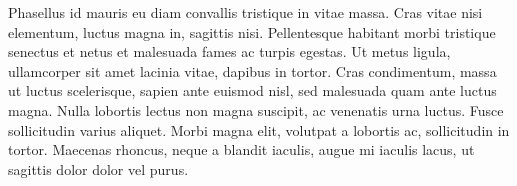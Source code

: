 Phasellus id mauris eu diam convallis tristique in vitae massa. Cras vitae nisi elementum, luctus magna in, sagittis nisi. Pellentesque habitant morbi tristique senectus et netus et malesuada fames ac turpis egestas. Ut metus ligula, ullamcorper sit amet lacinia vitae, dapibus in tortor. Cras condimentum, massa ut luctus scelerisque, sapien ante euismod nisl, sed malesuada quam ante luctus magna. Nulla lobortis lectus non magna suscipit, ac venenatis urna luctus. Fusce sollicitudin varius aliquet. Morbi magna elit, volutpat a lobortis ac, sollicitudin in tortor. Maecenas rhoncus, neque a blandit iaculis, augue mi iaculis lacus, ut sagittis dolor dolor vel purus.

